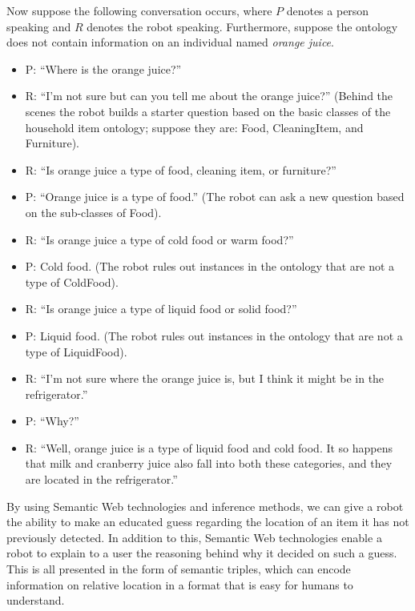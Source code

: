 \documentclass{article}
\begin{document}
Now suppose the following conversation occurs, where $P$ denotes a person
speaking and $R$ denotes the robot speaking. Furthermore, suppose the ontology
does not contain information on an individual named \textit{orange juice}.
\begin{itemize}
    \item P: ``Where is the orange juice?''
    \item R: ``I'm not sure but can you tell me about the orange juice?''
        (Behind the scenes the robot builds a starter question based on the
        basic classes of the household item ontology; suppose they are:
        Food, CleaningItem, and Furniture).
    \item R: ``Is orange juice a type of food, cleaning item, or
        furniture?''
    \item P: ``Orange juice is a type of food.'' (The robot can ask a new 
        question based on the sub-classes of Food).
    \item R: ``Is orange juice a type of cold food or warm food?''
    \item P: Cold food. (The robot rules out instances in the ontology that
        are not a type of ColdFood).
    \item R: ``Is orange juice a type of liquid food or solid food?''
    \item P: Liquid food. (The robot rules out instances in the ontology
        that are not a type of LiquidFood).
    \item R: ``I'm not sure where the orange juice is, but I think it might
        be in the refrigerator.''
    \item P: ``Why?''
    \item R: ``Well, orange juice is a type of liquid food and cold food.
        It so happens that milk and cranberry juice also fall into both 
        these categories, and they are located in the refrigerator.''
\end{itemize}

By using Semantic Web technologies and inference methods, we can give a
robot the ability to make an educated guess regarding the location of an
item it has not previously detected. In addition to this, Semantic Web 
technologies enable a robot to explain to a user the reasoning behind why it
decided on such a guess. This is all presented in the form of semantic 
triples, which can encode information on relative location in a format that
is easy for humans to understand.

\end{document}
